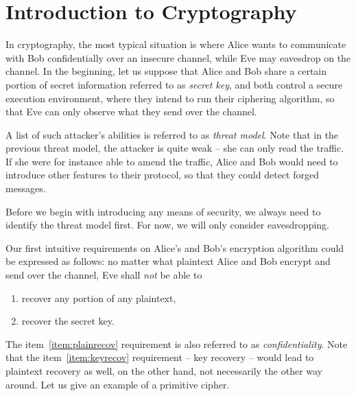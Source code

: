 \section{Introduction to Cryptography}
\label{sec:introcrypto}

In cryptography, the most typical situation is where Alice wants to communicate with Bob confidentially over an insecure channel, while Eve may eavesdrop on the channel. In the beginning, let us suppose that Alice and Bob share a certain portion of secret information referred to as {\em secret key}, and both control a secure execution environment, where they intend to run their ciphering algorithm, so that Eve can only observe what they send over the channel.

\begin{note}
\label{note:threat}
	A list of such attacker's abilities is referred to as {\em threat model}. Note that in the previous threat model, the attacker is quite weak -- she can only read the traffic. If she were for instance able to amend the traffic, Alice and Bob would need to introduce other features to their protocol, so that they could detect forged messages.
	
	Before we begin with introducing any means of security, we always need to identify the threat model first. For now, we will only consider eavesdropping.
\end{note}

Our first intuitive requirements on Alice's and Bob's encryption algorithm could be expressed as follows: no matter what plaintext Alice and Bob encrypt and send over the channel, Eve shall {\em not} be able to
\begin{enumerate}
	\item recover any portion of any plaintext, \label{item:plainrecov}
	\item recover the secret key. \label{item:keyrecov}
\end{enumerate}
The item~\ref{item:plainrecov} requirement is also referred to as {\em confidentiality}. Note that the item~\ref{item:keyrecov} requirement -- key recovery -- would lead to plaintext recovery as well, on the other hand, not necessarily the other way around. Let us give an example of a primitive cipher.

